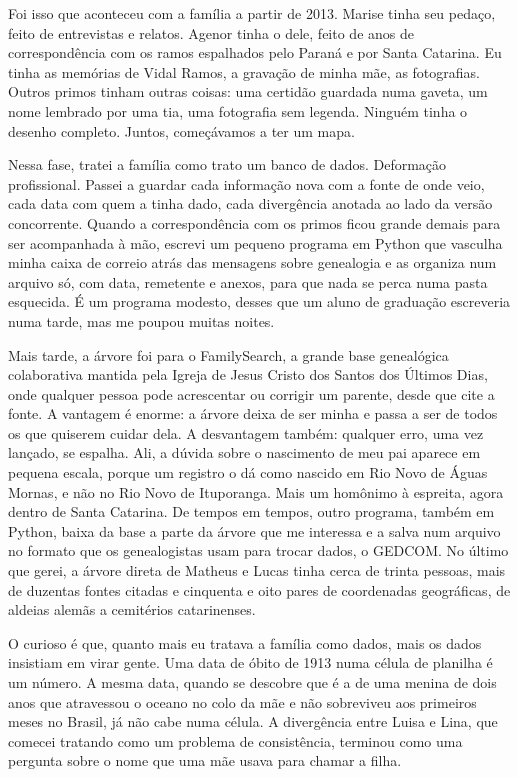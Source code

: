 \documentclass[
  brazilian,
  11pt,
  openany]{book}
\begin{document}
Foi isso que aconteceu com a família a partir de 2013. Marise tinha seu
pedaço, feito de entrevistas e relatos. Agenor tinha o dele, feito de
anos de correspondência com os ramos espalhados pelo Paraná e por Santa
Catarina. Eu tinha as memórias de Vidal Ramos, a gravação de minha mãe,
as fotografias. Outros primos tinham outras coisas: uma certidão
guardada numa gaveta, um nome lembrado por uma tia, uma fotografia sem
legenda. Ninguém tinha o desenho completo. Juntos, começávamos a ter um
mapa.

Nessa fase, tratei a família como trato um banco de dados. Deformação
profissional. Passei a guardar cada informação nova com a fonte de onde
veio, cada data com quem a tinha dado, cada divergência anotada ao lado
da versão concorrente. Quando a correspondência com os primos ficou
grande demais para ser acompanhada à mão, escrevi um pequeno programa em
Python que vasculha minha caixa de correio atrás das mensagens sobre
genealogia e as organiza num arquivo só, com data, remetente e anexos,
para que nada se perca numa pasta esquecida. É um programa modesto,
desses que um aluno de graduação escreveria numa tarde, mas me poupou
muitas noites.

Mais tarde, a árvore foi para o FamilySearch, a grande base genealógica
colaborativa mantida pela Igreja de Jesus Cristo dos Santos dos Últimos
Dias, onde qualquer pessoa pode acrescentar ou corrigir um parente,
desde que cite a fonte. A vantagem é enorme: a árvore deixa de ser minha
e passa a ser de todos os que quiserem cuidar dela. A desvantagem
também: qualquer erro, uma vez lançado, se espalha. Ali, a dúvida sobre
o nascimento de meu pai aparece em pequena escala, porque um registro o
dá como nascido em Rio Novo de Águas Mornas, e não no Rio Novo de
Ituporanga. Mais um homônimo à espreita, agora dentro de Santa Catarina.
De tempos em tempos, outro programa, também em Python, baixa da base a
parte da árvore que me interessa e a salva num arquivo no formato que os
genealogistas usam para trocar dados, o GEDCOM. No último que gerei, a
árvore direta de Matheus e Lucas tinha cerca de trinta pessoas, mais de
duzentas fontes citadas e cinquenta e oito pares de coordenadas
geográficas, de aldeias alemãs a cemitérios catarinenses.

O curioso é que, quanto mais eu tratava a família como dados, mais os
dados insistiam em virar gente. Uma data de óbito de 1913 numa célula de
planilha é um número. A mesma data, quando se descobre que é a de uma
menina de dois anos que atravessou o oceano no colo da mãe e não
sobreviveu aos primeiros meses no Brasil, já não cabe numa célula. A
divergência entre Luisa e Lina, que comecei tratando como um problema de
consistência, terminou como uma pergunta sobre o nome que uma mãe usava
para chamar a filha.
\end{document}
